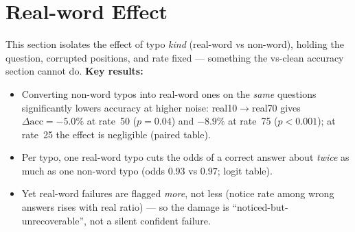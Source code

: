\documentclass[11pt]{article}
\begin{document}
\section*{Real-word Effect}
\noindent This section isolates the effect of typo \emph{kind}
(real-word vs non-word), holding the question, corrupted positions, and rate fixed ---
something the vs-clean accuracy section cannot do. \textbf{Key results:}
\begin{itemize}\setlength{\itemsep}{1pt}
  \item Converting non-word typos into real-word ones on the \emph{same} questions
  significantly lowers accuracy at higher noise: real10$\to$real70 gives
  $\Delta\mathrm{acc} = -5.0\%$ at rate~50 ($p = 0.04$) and $-8.9\%$ at rate~75
  ($p < 0.001$); at rate~25 the effect is negligible (paired table).
  \item Per typo, one real-word typo cuts the odds of a correct answer about
  \emph{twice} as much as one non-word typo (odds $0.93$ vs $0.97$; logit table).
  \item Yet real-word failures are flagged \emph{more}, not less (notice rate among
  wrong answers rises with real ratio) --- so the damage is
  ``noticed-but-unrecoverable'', not a silent confident failure.
\end{itemize}
\medskip
\end{document}
